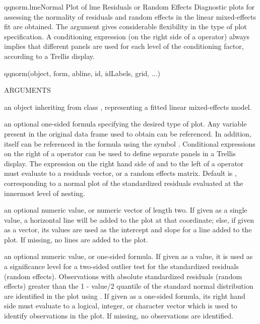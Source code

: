 \documentclass[pdftex]{article} \usepackage{url,graphicx}
\renewcommand{\Twiddle}{\mbox{\(\sim\)}}
\begin{document}
\begin{Helpfile}{qqnorm.lme}{Normal Plot of lme Residuals or Random Effects}
Diagnostic plots for assessing the normality of residuals and random
effects in the linear mixed-effects fit are obtained. The
 argument gives considerable flexibility in the type of
plot specification. A conditioning expression (on the right side of a
\Co{|} operator) always implies that different panels are used for
each level of the conditioning factor, according to a Trellis
display.
\begin{Example}
qqnorm(object, form, abline, id, idLabels, grid, ...)
\end{Example}
\begin{Argument}{ARGUMENTS}
\item[\Co{object:}]
an object inheriting from class , representing
a fitted linear mixed-effects model.
\item[\Co{form:}]
an optional one-sided formula specifying the desired type of
plot. Any variable present in the original data frame used to obtain
 can be referenced. In addition,  itself
can be referenced in the formula using the symbol
. Conditional expressions on the right of a \Co{|}
operator can be used to define separate panels in a Trellis
display. The expression on the right hand side of  and to
the left of a \Co{|} operator must evaluate to a residuals vector,
or a random effects matrix. Default is \Co{{\Twiddle} resid(., type = "p")},
corresponding to a normal plot of the standardized residuals
evaluated at the innermost level of nesting.
\item[\Co{abline:}]
an optional numeric value, or numeric vector of length
two. If given as a single value, a horizontal line will be added to the
plot at that coordinate; else, if given as a vector, its values are
used as the intercept and slope for a line added to the plot. If
missing, no lines are added to the plot.
\item[\Co{id:}]
an optional numeric value, or one-sided formula. If given as
a value, it is used as a significance level for a two-sided outlier
test for the standardized residuals (random effects). Observations with
absolute standardized residuals (random effects) greater than the
1 - value/2 quantile of the standard normal distribution are
identified in the plot using . If given as a one-sided
formula, its right hand side must evaluate to a  logical, integer, or
character vector which is used to identify observations in the
plot. If missing, no observations are identified.

\end{Argument}
\end{Helpfile}
\end{document}
